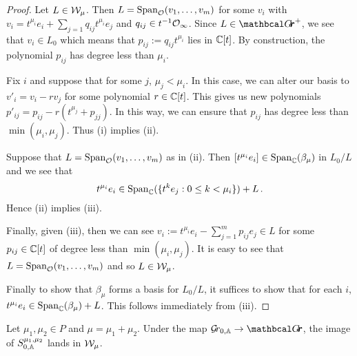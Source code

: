 \documentclass[draft]{article}
\begin{document}
\begin{proof}
    Let $ L \in \cW_\mu$.  Then $ L = \Sp_\cO(v_1, \dots, v_m) $ for some $ v_i $ with $ v_i = t^{\mu_i} e_i + \sum_{j=1} q_{ij}t^{\mu_i} e_j $ and $ q_{ij} \in t^{-1} \Oinf$.  Since $ L \in \Grth^+ $, we see that $ v_i \in L_0$ which means that $ p_{ij} := q_{ij}t^{\mu_i} $ lies in $ \CC[t]$.  By construction, the polynomial $ p_{ij}$ has degree less than $ \mu_i$.
    
    Fix $ i$ and suppose that for some $ j$, $ \mu_j < \mu_i$.  In this case, we can alter our basis to $ v'_i = v_i - r v_j$ for some polynomial $r \in \CC[t]$.  This gives us new polynomials $ p'_{ij} = p_{ij} - r (t^{\mu_j} + p_{jj}) $.  In this way, we can ensure that $ p_{ij} $ has degree less than $ \min(\mu_i, \mu_j)$.  Thus (i) implies (ii).
    
    Suppose that $ L = \Sp_\cO(v_1, \dots, v_m)$ as in (ii).  Then $[t^{\mu_i} e_i] \in \Sp_\CC(\beta_\mu) $ in $ L_0/L$ and we see that 
    $$t^{\mu_i} e_i \in \Sp_\CC(\{t^k e_j : 0 \le k < \mu_i \}) + L\,. $$
    Hence (ii) implies (iii).  

    Finally, given (iii), then we can see $ v_i := t^{\mu_i} e_i - \sum_{j=1}^m p_{ij} e_j \in L $ for some $ p_{ij} \in \CC[t]$ of degree less than $ \min(\mu_i,\mu_j) $.  It is easy to see that $ L = \Sp_\cO(v_1, \dots, v_m) $ and so $ L \in \cW_\mu$.  
    
    Finally to show that $ \beta_\mu$ forms a basis for $ L_0/L$, it suffices to show that for each $ i$, $ t^{\mu_i} e_i  \in \Sp_\CC(\beta_\mu) + L$.  This follows immediately from (iii).
    \end{proof}



\begin{lemma}
    Let $\mu_1,\mu_2 \in P$ and $\mu = \mu_1 + \mu_2$. Under the map $ \Grbd \rightarrow \Grth$, the image of $ S^{\mu_1, \mu_2}_{0,\AA}$ lands in $ \cW_\mu$.
\end{lemma}
\end{document}
